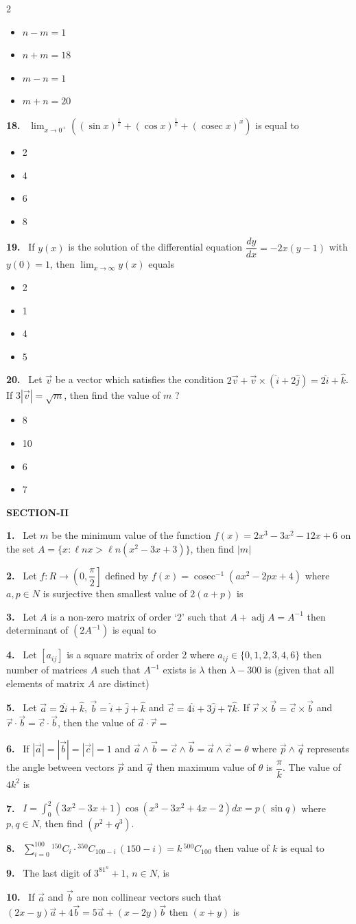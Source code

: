 \documentclass[10pt]{extarticle}
\newcommand{\sect}[1]{\par\smallskip\noindent\textbf{#1}\par}
\newcommand{\qn}[1]{\par\smallskip\noindent\textbf{#1.}~}
\newenvironment{qoptions}{\begin{itemize}[leftmargin=1.8em,itemsep=1pt,topsep=2pt,label={}]}{\end{itemize}}
\newcommand{\opt}[2]{\item[(#1)] #2}
\begin{document}
\begin{multicols}{2}
\begin{qoptions}
\opt{A}{$n-m=1$}
\opt{B}{$n+m=18$}
\opt{C}{$m-n=1$}
\opt{D}{$m+n=20$}
\end{qoptions}
\qn{18} $\displaystyle\lim_{x\to0^+}\left((\sin x)^{\frac1x}+(\cos x)^{\frac1x}+(\operatorname{cosec}x)^x\right)$ is equal to
\begin{qoptions}
\opt{A}{2}
\opt{B}{4}
\opt{C}{6}
\opt{D}{8}
\end{qoptions}
\qn{19} If $y(x)$ is the solution of the differential equation $\dfrac{dy}{dx}=-2x(y-1)$ with $y(0)=1$, then $\displaystyle\lim_{x\to\infty}y(x)$ equals
\begin{qoptions}
\opt{A}{2}
\opt{B}{1}
\opt{C}{4}
\opt{D}{5}
\end{qoptions}
\qn{20} Let $\vec v$ be a vector which satisfies the condition $2\vec v+\vec v\times\left(\hat i+2\hat j\right)=2\hat i+\hat k$. If $3\left|\vec v\right|=\sqrt m$, then find the value of $m$ ?
\begin{qoptions}
\opt{A}{8}
\opt{B}{10}
\opt{C}{6}
\opt{D}{7}
\end{qoptions}
\sect{SECTION-II}
\qn{1} Let $m$ be the minimum value of the function $f(x)=2x^3-3x^2-12x+6$ on the set $A=\{x:\ell nx>\ell n(x^2-3x+3)\}$, then find $|m|$
\qn{2} Let $f:R\to\left(0,\dfrac\pi2\right]$ defined by $f(x)=\operatorname{cosec}^{-1}(ax^2-2px+4)$ where $a,p\in N$ is surjective then smallest value of $2(a+p)$ is
\qn{3} Let $A$ is a non-zero matrix of order `2' such that $A+\operatorname{adj}A=A^{-1}$ then determinant of $(2A^{-1})$ is equal to
\qn{4} Let $[a_{ij}]$ is a square matrix of order 2 where $a_{ij}\in\{0,1,2,3,4,6\}$ then number of matrices $A$ such that $A^{-1}$ exists is $\lambda$ then $\lambda-300$ is (given that all elements of matrix $A$ are distinct)
\qn{5} Let $\vec a=2\hat i+\hat k$, $\vec b=\hat i+\hat j+\hat k$ and $\vec c=4\hat i+3\hat j+7\hat k$. If $\vec r\times\vec b=\vec c\times\vec b$ and $\vec r\cdot\vec b=\vec c\cdot\vec b$, then the value of $\vec a\cdot\vec r=$
\qn{6} If $|\vec a|=|\vec b|=|\vec c|=1$ and $\vec a\mathbin{\wedge}\vec b=\vec c\mathbin{\wedge}\vec b=\vec a\mathbin{\wedge}\vec c=\theta$ where $\vec p\mathbin{\wedge}\vec q$ represents the angle between vectors $\vec p$ and $\vec q$ then maximum value of $\theta$ is $\dfrac\pi k$. The value of $4k^2$ is
\qn{7} $I=\displaystyle\int_0^2(3x^2-3x+1)\cos\left(x^3-3x^2+4x-2\right)dx=p(\sin q)$ where $p,q\in N$, then find $(p^2+q^3)$.
\qn{8} $\displaystyle\sum_{i=0}^{100}{}^{150}C_i\cdot{}^{350}C_{100-i}\,(150-i)=k\,{}^{500}C_{100}$ then value of $k$ is equal to
\qn{9} The last digit of $3^{81^n}+1$, $n\in N$, is
\qn{10} If $\vec a$ and $\vec b$ are non collinear vectors such that $(2x-y)\vec a+4\vec b=5\vec a+(x-2y)\vec b$ then $(x+y)$ is
\end{multicols}
\end{document}

